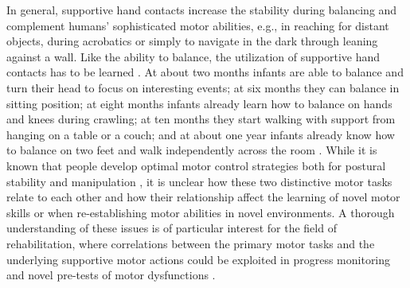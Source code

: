 In general, supportive hand contacts increase the stability during balancing and 
complement humans' sophisticated motor abilities, e.g., in reaching for distant 
objects, during acrobatics or simply to navigate in the dark through leaning 
against a wall\cite{cordo1982properties, jeka1994fingertip, 
balasubramaniam2002dynamics, dickstein2003effects}. 
Like the ability to balance, the utilization of supportive hand contacts has to be learned \cite{reed1982outline, Hofsten1993prospective}. 
At about two months infants are able to balance and turn their head to focus on 
interesting events; at six months they can balance in sitting position; at eight 
months infants already learn how to balance on hands and knees during crawling; 
at ten months they start walking with support from hanging on a table or a 
couch; and at about one year infants already know how to balance on two feet and 
walk independently across the room \cite{adolph2002learning, adolph2006motor}. 
While it is known that people develop optimal motor control strategies both for 
postural stability and manipulation \cite{pai1997center, scott2004optimal, 
todorov2004optimality}, it is unclear how these two distinctive motor tasks 
relate to each other and how their relationship affect the learning of novel motor 
skills or when re-establishing motor abilities in novel environments. A thorough 
understanding of these issues is of particular interest for the field of 
rehabilitation, where correlations between the primary motor tasks and the 
underlying supportive motor actions could be exploited in progress monitoring 
and novel pre-tests of motor dysfunctions \cite{duncan1990functional}. 


